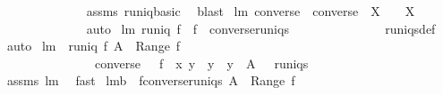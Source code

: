 \begin{isabellebody}
\ \ \ \ \ \ \ \ \ \ \ \ \isamarkupfalse%
\ assms\ runiq{\isacharunderscore}basic\ \isamarkupfalse%
\ blast%
\endisatagproof
{\isafoldproof}%
%
\isadelimproof
\isanewline
%
\endisadelimproof
\isanewline
{}\isamarkupfalse%
\ lm{}{}{\isacharcolon}\ {\isachardoublequoteopen}converse\ {\isacharbackquote}\ {\isacharparenleft}converse\ {\isacharbackquote}\ X{\isacharparenright}\ \ {\isacharequal}\ \ X{\isachardoublequoteclose}\ \isanewline
%
\isadelimproof
\ \ \ \ \ \ \ \ \ \ \ \ %
\endisadelimproof
%
\isatagproof
{}\isamarkupfalse%
\ auto%
\endisatagproof
{\isafoldproof}%
%
\isadelimproof
\isanewline
%
\endisadelimproof
\isanewline
{}\isamarkupfalse%
\ lm{}{}{\isacharcolon}\ {\isachardoublequoteopen}runiq\ {\isacharparenleft}f{\isacharcircum}{\isacharminus}{}{\isacharparenright}\ {\isacharequal}\ {\isacharparenleft}f\ {\isasymin}\ converse{\isacharbackquote}runiqs{\isacharparenright}{\isachardoublequoteclose}\ \isanewline
%
\isadelimproof
\ \ \ \ \ \ \ \ \ \ \ \ %
\endisadelimproof
%
\isatagproof
{}\isamarkupfalse%
\ runiqs{\isacharunderscore}def\ \isamarkupfalse%
\ auto%
\endisatagproof
{\isafoldproof}%
%
\isadelimproof
\isanewline
%
\endisadelimproof
\isanewline
{}\isamarkupfalse%
\ lm{}{}{\isacharcolon}\ \ {\isachardoublequoteopen}runiq\ {\isacharparenleft}f{\isacharcircum}{\isacharminus}{}{\isacharparenright}{\isachardoublequoteclose}\ {\isachardoublequoteopen}A\ {\isasyminter}\ Range\ f\ \ {\isacharequal}\ \ {\isacharbraceleft}{\isacharbraceright}{\isachardoublequoteclose}\ \isanewline
\ \ \ \ \ \ \ \ \ \ \ \ \ \ \ {\isachardoublequoteopen}converse\ {\isacharbackquote}\ {\isacharbraceleft}\ f\ {\isasymunion}\ {\isacharbraceleft}{\isacharparenleft}x{\isacharcomma}\ y{\isacharparenright}{\isacharbraceright}\ {\isacharbar}\ y\ {\isachardot}\ y\ {\isasymin}\ A\ {\isacharbraceright}\ {\isasymsubseteq}\ runiqs{\isachardoublequoteclose}\ \isanewline
%
\isadelimproof
\ \ \ \ \ \ \ \ \ \ \ \ %
\endisadelimproof
%
\isatagproof
{}\isamarkupfalse%
\ assms\ lm{}{}\ \isamarkupfalse%
\ fast%
\endisatagproof
{\isafoldproof}%
%
\isadelimproof
\isanewline
%
\endisadelimproof
\isanewline
{}\isamarkupfalse%
\ lm{}{}b{\isacharcolon}\ \ {\isachardoublequoteopen}f{\isasymin}converse{\isacharbackquote}runiqs{\isachardoublequoteclose}\ {\isachardoublequoteopen}A\ {\isasyminter}\ Range\ f\ \ {\isacharequal}\ \ {\isacharbraceleft}{\isacharbraceright}{\isachardoublequoteclose}\ \isanewline

\end{isabellebody}
